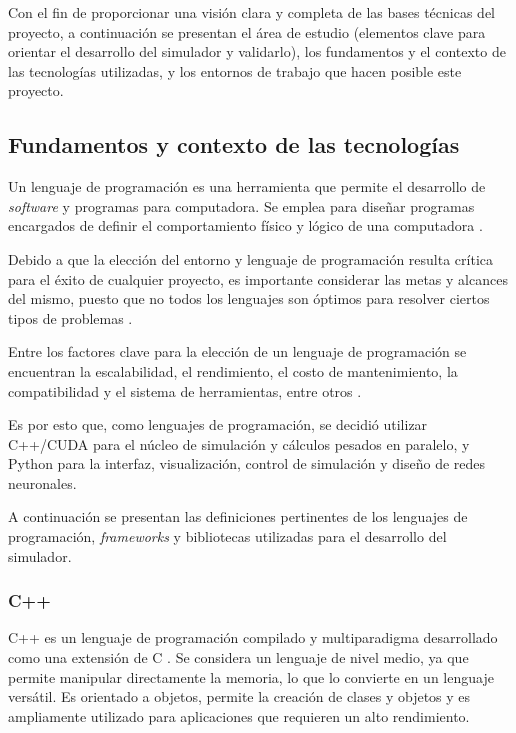 Con el fin de proporcionar una visión clara y completa de las bases técnicas del proyecto, a continuación se presentan el área de estudio (elementos clave para orientar el desarrollo del simulador y validarlo), los fundamentos y el contexto de las tecnologías utilizadas, y los entornos de trabajo que hacen posible este proyecto. 

\subsection{Fundamentos y contexto de las tecnologías}

Un lenguaje de programación es una herramienta que permite el desarrollo de \textit{software} y programas para computadora. Se emplea para diseñar programas encargados de definir el comportamiento físico y lógico de una computadora \cite{uapa2025_lenguajes}.

Debido a que la elección del entorno y lenguaje de programación resulta crítica para el éxito de cualquier proyecto, es importante considerar las metas y alcances del mismo, puesto que no todos los lenguajes son óptimos para resolver ciertos tipos de problemas \cite{clickpanda2023_entorno}.

Entre los factores clave para la elección de un lenguaje de programación se encuentran la escalabilidad, el rendimiento, el costo de mantenimiento, la compatibilidad y el sistema de herramientas, entre otros \cite{clickpanda2023_entorno}.

Es por esto que, como lenguajes de programación, se decidió utilizar C++/CUDA para el núcleo de simulación y cálculos pesados en paralelo, y Python para la interfaz, visualización, control de simulación y diseño de redes neuronales. 

A continuación se presentan las definiciones pertinentes de los lenguajes de programación, \textit{frameworks} y bibliotecas utilizadas para el desarrollo del simulador.

\subsubsection{C++}

C++ es un lenguaje de programación compilado y multiparadigma desarrollado como una extensión de C \cite{valladolid_c}. Se considera un lenguaje de nivel medio, ya que permite manipular directamente la memoria, lo que lo convierte en un lenguaje versátil. Es orientado a objetos, permite la creación de clases y objetos y es ampliamente utilizado para aplicaciones que requieren un alto rendimiento.


